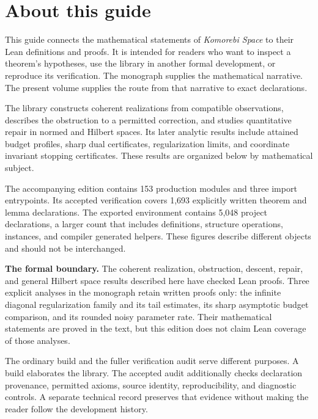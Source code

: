 \documentclass[11pt]{article}
\begin{document}
\KomorebiCover
\section*{About this guide}
This guide connects the mathematical statements of \emph{Komorebi Space} to their Lean definitions and proofs. It is intended for readers who want to inspect a theorem's hypotheses, use the library in another formal development, or reproduce its verification. The monograph supplies the mathematical narrative. The present volume supplies the route from that narrative to exact declarations.

The library constructs coherent realizations from compatible observations, describes the obstruction to a permitted correction, and studies quantitative repair in normed and Hilbert spaces. Its later analytic results include attained budget profiles, sharp dual certificates, regularization limits, and coordinate invariant stopping certificates. These results are organized below by mathematical subject.

The accompanying edition contains 153 production modules and three import entrypoints. Its accepted verification covers 1,693 explicitly written theorem and lemma declarations. The exported environment contains 5,048 project declarations, a larger count that includes definitions, structure operations, instances, and compiler generated helpers. These figures describe different objects and should not be interchanged.

\begin{scopebox}
\textbf{The formal boundary.} The coherent realization, obstruction, descent, repair, and general Hilbert space results described here have checked Lean proofs. Three explicit analyses in the monograph retain written proofs only: the infinite diagonal regularization family and its tail estimates, its sharp asymptotic budget comparison, and its rounded noisy parameter rate. Their mathematical statements are proved in the text, but this edition does not claim Lean coverage of those analyses.
\end{scopebox}

The ordinary build and the fuller verification audit serve different purposes. A build elaborates the library. The accepted audit additionally checks declaration provenance, permitted axioms, source identity, reproducibility, and diagnostic controls. A separate technical record preserves that evidence without making the reader follow the development history.

\clearpage
\tableofcontents
\clearpage
\end{document}
